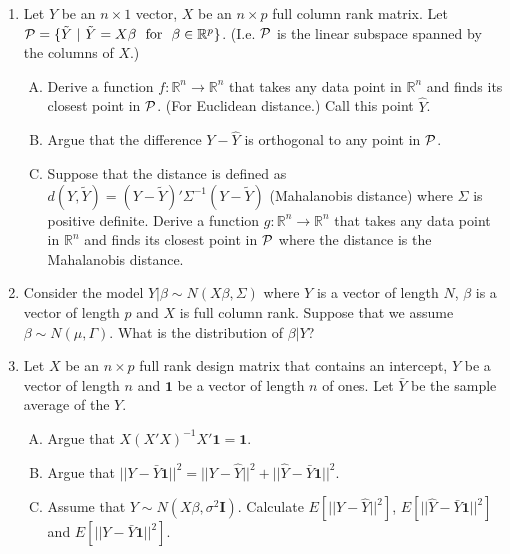 \documentclass[12pt]{article}
\begin{document}
\begin{enumerate}[1.]
\item Let $Y$ be an $n\times 1$ vector, $X$ be an $n\times p$ full column rank matrix. Let
${\cal P} = \{ \tilde Y ~|~ \tilde Y = X \beta ~~\mbox{for}~~ \beta \in \mathbb{R}^p\}$. 
(I.e. ${\cal P}$ is the linear subspace spanned by the columns of $X$.)
\begin{enumerate}[A.]
\item Derive a function $f : \mathbb{R}^n \rightarrow \mathbb{R}^n$ that takes any
data point in $\mathbb{R}^n$ and finds its closest point in ${\cal P}$. (For Euclidean distance.)
Call this point $\hat Y$.
\item Argue that the difference $Y - \hat Y$ is orthogonal to any point in ${\cal P}$. 
\item Suppose that the distance is defined as $d(Y, \tilde Y) = (Y - \tilde Y)' \Sigma^{-1} (Y - \tilde Y)$
(Mahalanobis distance) where $\Sigma$ is positive definite. Derive a function
$g:\mathbb{R}^n \rightarrow \mathbb{R}^n$ that takes any
data point in $\mathbb{R}^n$ and finds its closest point in ${\cal P}$ where
the distance is the Mahalanobis distance.
\end{enumerate}

\newpage

\item Consider the model $Y | \beta \sim N(X\beta, \Sigma)$ where $Y$ is a vector of length $N$,
$\beta$ is a vector of length $p$ and $X$ is full column rank. Suppose that we assume
$\beta \sim N(\mu, \Gamma)$. What is the distribution of $\beta | Y$? 

\newpage

\item Let $X$ be an $n\times p$ full rank design matrix that contains an intercept, $Y$ be a vector of length $n$
and $\mathbf{1}$ be a vector of length $n$ of ones. Let $\bar{Y}$ be the sample average of the $Y$.
  \begin{enumerate}[A.]
  \item Argue that $X (X'X)^{-1} X' \mathbf{1} = \mathbf{1}$. 
    \item Argue that $||Y - \bar{Y} \mathbf{1}||^2 = ||Y - \hat Y||^2 + ||\hat Y - \bar{Y}\mathbf{1}||^2$.
    \item Assume that $Y \sim N(X\beta, \sigma^2 \mathbf{I})$. Calculate $E[||Y - \hat Y||^2]$, 
      $E[ ||\hat Y - \bar{Y}\mathbf{1}||^2]$ and $E[||Y - \bar{Y} \mathbf{1}||^2]$.
  \end{enumerate}

\end{enumerate}
\end{document}
